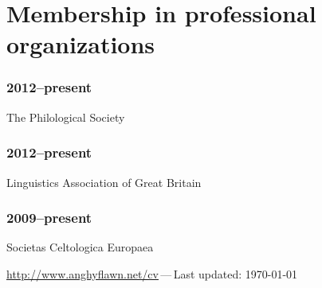 \documentclass[a4paper,11pt]{article}
\newlength\blockwidth
\newcommand\cvitem[1]{\hspace*{\blockwidth}\begin{minipage}[t]{\linewidth-\blockwidth}
#1
\end{minipage}\par}
\newcommand{\block}[2]{\subsubsection{#1}\cvitem{#2}}
\begin{document}
\section{Membership in professional organizations}
\block{2012--present}{The Philological Society}
\block{2012--present}{Linguistics Association of Great Britain}
\block{2009--present}{Societas Celtologica Europaea}

\vfill{}
\hrulefill

\begin{center}
{\footnotesize \href{http://www.anghyflawn.net/cv}{http://www.anghyflawn.net/cv}{\,---\,}Last  updated: \today
}
\end{center}
\end{document}
